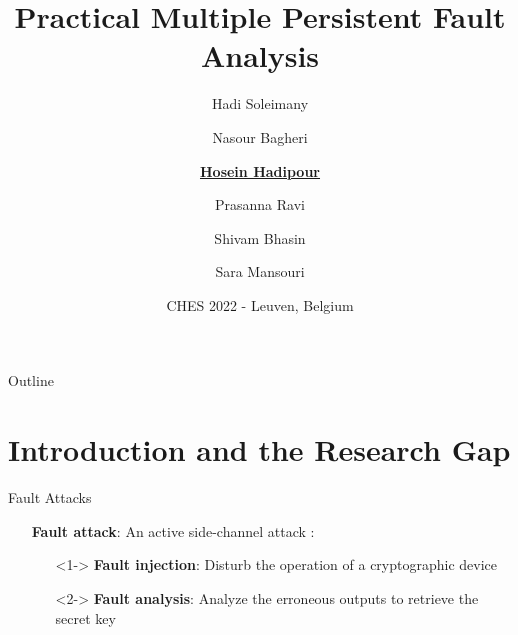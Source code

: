 \documentclass[table,aspectratio=169]{beamer}
\title{Practical Multiple Persistent Fault Analysis}
\author{Hadi Soleimany \and Nasour Bagheri \and \underline{\textbf{Hosein Hadipour}} \and Prasanna Ravi \and Shivam Bhasin \and Sara Mansouri}
\date{CHES 2022 - Leuven, Belgium}
\begin{document}
\begin{frame}[plain]
  \maketitle
\end{frame}


\section*{}
\begin{frame}{Outline}
  \tableofcontents
\end{frame}

\section{Introduction and the Research Gap}

\begin{frame}{Fault Attacks}
\begin{itemize}
\item[\faWarning] \textbf{Fault attack}: An active side-channel attack \cite{eurocrypt_BonehDL97}:
\begin{itemize}
	\item[\faMagic]<1-> \textbf{Fault injection}: Disturb the operation of a cryptographic device	
	\item[\faLaptop]<2-> \textbf{Fault analysis}: Analyze the erroneous outputs to retrieve the secret key
\end{itemize}
\end{itemize}
\begin{figure}
\centering
{}
\end{figure}
\end{frame}
\end{document}
